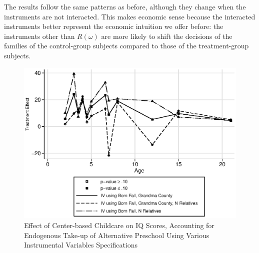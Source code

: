 \begin{appendices}
\noindent The results follow the same patterns as before, although they change when the instruments are not interacted. This makes economic sense because the interacted instruments better represent the economic intuition we offer before: the instruments other than $R(\omega)$ are more likely to shift the decisions of the families of the control-group subjects compared to those of the treatment-group subjects.

\begin{figure}[H]
		\caption{Effect of Center-based Childcare on IQ Scores, Accounting for Endogenous Take-up of Alternative Preschool Using Various Instrumental Variables Specifications} \label{fig:nointer_Q_iv}
		\includegraphics[width=.7\columnwidth]{output/appendixplots/nointer_Q_iv_te.eps}
\end{figure}


\end{appendices}
